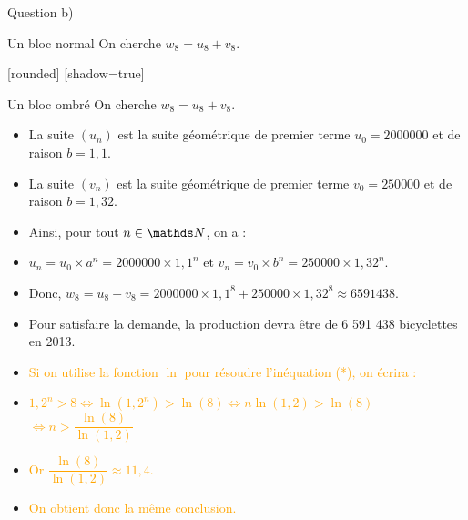 \documentclass[french,onlymath]{beamer}
\begin{document}
\begin{frame}[allowframebreaks]{Question b)}


\label{départ}

\pause
\begin{block}{Un bloc normal}
On cherche $w_8=u_8+v_8$.
\end{block}	

\pause	
{}[rounded]
[shadow=true]	
	\begin{block}{Un bloc ombré}
On cherche $w_8=u_8+v_8$.
\end{block}

\begin{itemize}		
	\item La suite $(u_n)$ est la suite géométrique de premier terme $u_0=2 000 000$ et de raison $b=1,1$.
		
	\item La suite $(v_n)$ est la suite géométrique de premier terme $v_0=250 000$ et de raison $b=1,32$.
	
	\item Ainsi, pour tout $n \in \N$, on a :
	
	\item $u_n=u_0 \times a^n=2 000 000 \times 1,1^n$ et $v_n=v_0 \times b^n=250 000 \times 1,32^n$.
	
	\item Donc, $w_8=u_8+v_8=2 000 000 \times 1,1^8 + 250 000 \times 1,32^8 \approx 6 591 438$.
	
	\item Pour satisfaire la demande, la production devra être de 6 591 438 bicyclettes en 2013.
	
	\item\textcolor{orange}{Si on utilise la fonction $\ln$ pour résoudre l'inéquation (*), on écrira :}
		
	\pause\item\textcolor{orange}{$1,2^n > 8 \Leftrightarrow \ln \left( 1,2^n\right) > \ln (8) \Leftrightarrow n \ln (1,2) > \ln (8)$\\
	$\Leftrightarrow n > \dfrac{\ln(8)}{\ln(1,2)}$}
		
	\pause\item\textcolor{orange}{Or $\dfrac{\ln(8)}{\ln(1,2)} \approx 11,4$.}
	
	\pause\item\textcolor{orange}{On obtient donc la même conclusion.}
	
	\end{itemize}
\end{frame}
\end{document}
